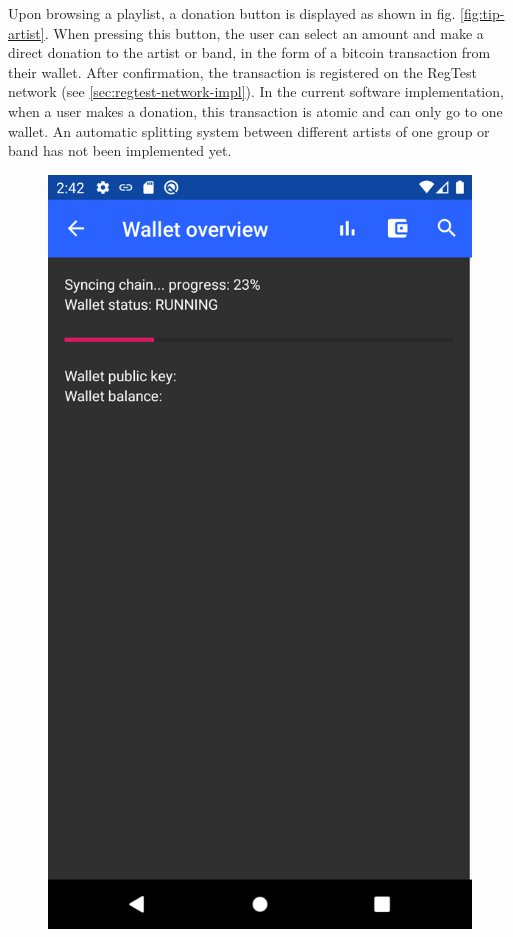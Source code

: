 Upon browsing a playlist, a donation button is displayed as shown in fig. \ref{fig:tip-artist}. When pressing this button, the user can select an amount and make a direct donation to the artist or band, in the form of a bitcoin transaction from their wallet. After confirmation, the transaction is registered on the RegTest network (see \ref{sec:regtest-network-impl}). In the current software implementation, when a user makes a donation, this transaction is atomic and can only go to one wallet. An automatic splitting system between different artists of one group or band has not been implemented yet.
\begin{figure}
        \includegraphics[width=1\linewidth]{implementation/wallet-sync.png}

\end{figure}
